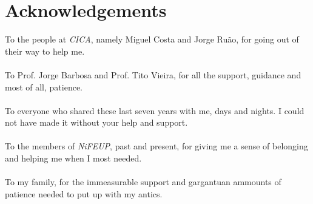 \chapter*{Acknowledgements}

To the people at \emph{CICA}, namely Miguel Costa and Jorge Ruão, for going out of their way to help me.\\
\ \\
To Prof. Jorge Barbosa and Prof. Tito Vieira, for all the support, guidance and most of all, patience.\\
\ \\
To everyone who shared these last seven years with me, days and nights. I could not have made it without your help and support.\\
\ \\
To the members of \emph{NiFEUP}, past and present, for giving me a sense of belonging and helping me when I most needed.\\
\ \\
To my family, for the immeasurable support and gargantuan ammounts of patience needed to put up with my antics.

\vspace{10mm}
